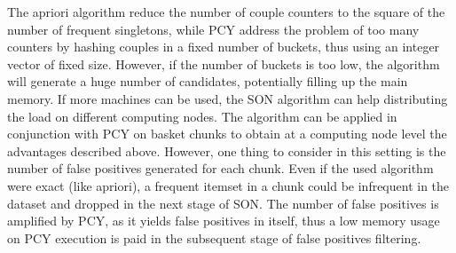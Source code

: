 \documentclass{article}
\begin{document}
The apriori algorithm reduce the number of couple counters to the square of the number of frequent singletons, while PCY address the problem of too many counters by hashing couples in a fixed number of buckets, thus using an integer vector of fixed size. However, if the number of buckets is too low, the algorithm will generate a huge number of candidates, potentially filling up the main memory.
If more machines can be used, the SON algorithm can help distributing the load on different computing nodes. The algorithm can be applied in conjunction with PCY on basket chunks to obtain at a computing node level the advantages described above. However, one thing to consider in this setting is the number of false positives generated for each chunk. Even if the used algorithm were exact (like apriori), a frequent itemset in a chunk could be infrequent in the dataset and dropped in the next stage of SON. The number of false positives is amplified by PCY, as it yields false positives in itself, thus a low memory usage on PCY execution is paid in the subsequent stage of false positives filtering.
\end{document}

